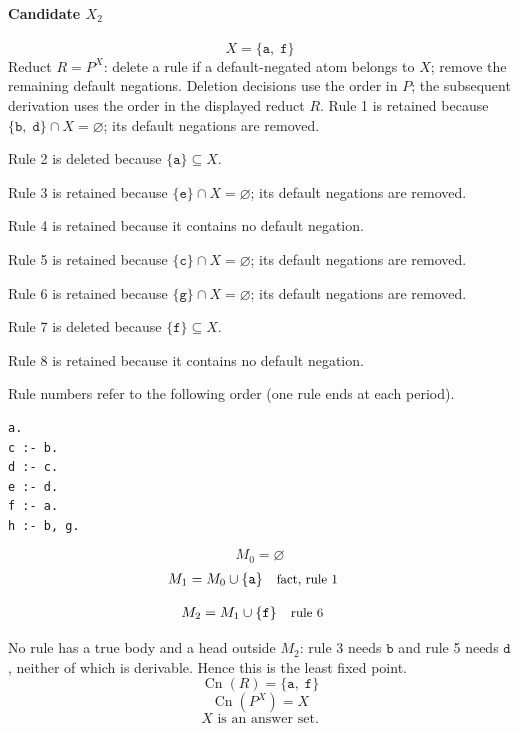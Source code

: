 \documentclass[a4paper,11pt]{article}
\newif\ifexplain
\newcommand{\explain}[1]{\ifexplain\begin{erklbox}#1\end{erklbox}\fi}
\newcommand{\why}[1]{\text{\small #1}}
\newcommand{\at}[1]{\texttt{#1}}
\begin{document}
\paragraph{Candidate $X_2$}
\[
X=\{\at{a},\;\at{f}\}
\]
Reduct $R=P^X$: delete a rule if a default-negated atom belongs to $X$; remove the remaining default negations. Deletion decisions use the order in $P$; the subsequent derivation uses the order in the displayed reduct $R$.
Rule 1 is retained because $\{\at{b},\;\at{d}\}\cap X=\varnothing$; its default negations are removed.

Rule 2 is deleted because $\{\at{a}\}\subseteq X$.

Rule 3 is retained because $\{\at{e}\}\cap X=\varnothing$; its default negations are removed.

Rule 4 is retained because it contains no default negation.

Rule 5 is retained because $\{\at{c}\}\cap X=\varnothing$; its default negations are removed.

Rule 6 is retained because $\{\at{g}\}\cap X=\varnothing$; its default negations are removed.

Rule 7 is deleted because $\{\at{f}\}\subseteq X$.

Rule 8 is retained because it contains no default negation.

Rule numbers refer to the following order (one rule ends at each period).
\begin{small}
\begin{verbatim}
a.
c :- b.
d :- c.
e :- d.
f :- a.
h :- b, g.
\end{verbatim}
\end{small}
\explain{Beim Redukt bleibt die Kandidatenmenge fest. Wir entscheiden zuerst, welche Regeln wegfallen. Erst danach berechnen wir aus den verbleibenden positiven Regeln die kleinste abgeschlossene Menge. Ein Modell allein reicht nicht: Diese Menge muss genau der Kandidat sein.}
\[
M_0=\varnothing
\]
\begin{align*}
M_{1} &= M_{0}\cup \{\at{a}\} && \why{fact, rule 1}
\end{align*}
\explain{Diese Regel hat keinen Körper. Ihr Kopf $\at{a}$ ist damit ein Fakt und muss in die Menge.}
\begin{align*}
M_{2} &= M_{1}\cup \{\at{f}\} && \why{rule 6}
\end{align*}
\explain{Für $\at{f}$ brauchen wir $\at{a}$. Weil diese Voraussetzung bereits hergeleitet ist, dürfen wir den Regelkopf jetzt aufnehmen und alle bisherigen Atome behalten; bei einer fehlenden Voraussetzung würde diese Regel dagegen noch nichts beitragen.}
No rule has a true body and a head outside $M_{2}$: rule 3 needs $\at{b}$ and rule 5 needs $\at{d}$, neither of which is derivable. Hence this is the least fixed point.
\[
\operatorname{Cn}(R)=\{\at{a},\;\at{f}\}
\]
\[
\operatorname{Cn}(P^X)=X
\]
\[
\boxed{X\text{ is an answer set.}}
\]
\end{document}
